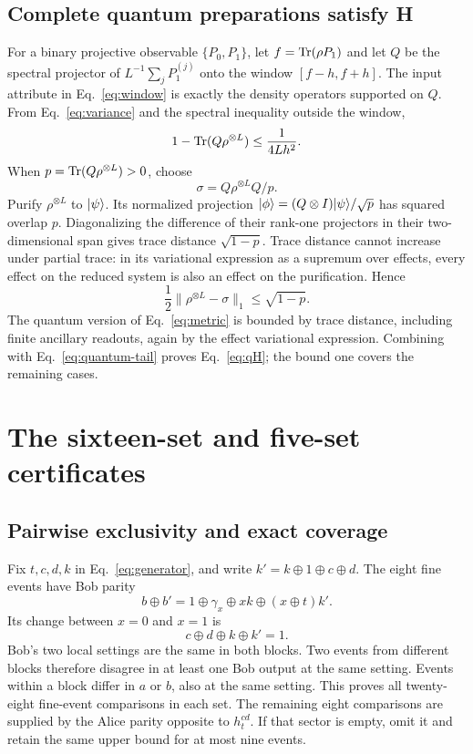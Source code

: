 \subsection{Complete quantum preparations satisfy H}
For a binary projective observable $\{P_0,P_1\}$, let $f=\operatorname{Tr}(\rho P_1)$ and let $Q$ be the spectral projector of $L^{-1}\sum_jP_1^{(j)}$ onto the window $[f-h,f+h]$. The input attribute in Eq.~\eqref{eq:window} is exactly the density operators supported on $Q$. From Eq.~\eqref{eq:variance} and the spectral inequality outside the window,
\begin{equation}\label{eq:quantum-tail}
 1-\Tr(Q\rho^{\otimes L})\leq\frac1{4Lh^2}.
\end{equation}
When $p=\operatorname{Tr}(Q\rho^{\otimes L})>0$, choose
\begin{equation}\label{eq:projected-state}
 \sigma=Q\rho^{\otimes L}Q/p.
\end{equation}
Purify $\rho^{\otimes L}$ to $\lvert \psi\rangle$. Its normalized projection $\lvert \phi\rangle=(Q\otimes I)\lvert \psi\rangle/\sqrt p$ has squared overlap $p$. Diagonalizing the difference of their rank-one projectors in their two-dimensional span gives trace distance $\sqrt{1-p}$. Trace distance cannot increase under partial trace: in its variational expression as a supremum over effects, every effect on the reduced system is also an effect on the purification. Hence
\begin{equation}\label{eq:gentle}
 \frac12\|\rho^{\otimes L}-\sigma\|_1\leq\sqrt{1-p}.
\end{equation}
The quantum version of Eq.~\eqref{eq:metric} is bounded by trace distance, including finite ancillary readouts, again by the effect variational expression. Combining with Eq.~\eqref{eq:quantum-tail} proves Eq.~\eqref{eq:qH}; the bound one covers the remaining cases.

\section{The sixteen-set and five-set certificates}\label{app:certificates}
\subsection{Pairwise exclusivity and exact coverage}
Fix $t,c,d,k$ in Eq.~\eqref{eq:generator}, and write $k'=k\oplus1\oplus c\oplus d$. The eight fine events have Bob parity
\begin{equation}\label{eq:bob-parity}
 b\oplus b'=1\oplus\gamma_x\oplus xk\oplus(x\oplus t)k'.
\end{equation}
Its change between $x=0$ and $x=1$ is
\begin{equation}\label{eq:parity-change}
 c\oplus d\oplus k\oplus k'=1.
\end{equation}
Bob's two local settings are the same in both blocks. Two events from different blocks therefore disagree in at least one Bob output at the same setting. Events within a block differ in $a$ or $b$, also at the same setting. This proves all twenty-eight fine-event comparisons in each set. The remaining eight comparisons are supplied by the Alice parity opposite to $h_t^{cd}$. If that sector is empty, omit it and retain the same upper bound for at most nine events.


